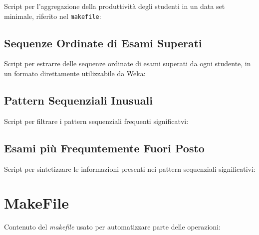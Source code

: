 \begin{appendices}
            Script per l'aggregazione della produttività degli studenti in un data set minimale, riferito nel \texttt{makefile}:
            

        \subsection{Sequenze Ordinate di Esami Superati}
        \label{appendix:seq}

            Script per estrarre delle sequenze ordinate di esami superati da ogni studente, in un formato direttamente utilizzabile da Weka:
            

        \subsection{Pattern Sequenziali Inusuali}
        \label{appendix:unusual}

            Script per filtrare i pattern sequenziali frequenti significatvi:
            

        \subsection{Esami più Frequntemente Fuori Posto}
        \label{appendix:freq}

            Script per sintetizzare le informazioni presenti nei pattern sequenziali significativi:
            

    \section{MakeFile}
    \label{appendix:makefile}

        Contenuto del \textit{makefile} usato per automatizzare parte delle operazioni:


\end{appendices}
